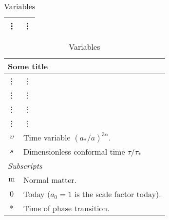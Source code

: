 \begin{table}
\begin{minipage}{0.5\linewidth}
{{\begin{tabular*}{\linewidth}{c l}
            \vdots & \vdots\\
            \bottomrule
        \end{tabular*}
        }}
    \end{minipage}\hfill
    \begin{minipage}{0.5\linewidth}
        {\small{
        \begin{tabular*}{\linewidth}{c l}
            \multicolumn{2}{l}{\textsf{Some title}} \\
            \toprule
            \vdots & \vdots \\
            \vdots & \vdots \\
            \vdots & \vdots \\
            \vdots & \vdots \\
            $\upsilon$ &  Time variable $(a_\ast/a)^{3\alpha}$. \\
            $s$ &  Dimensionless conformal time $\tau/\tau_\ast$  \\
            \midrule
            \multicolumn{2}{l}{\textit{Subscripts}} \\
            \midrule
            $\mathrm{m}$ & Normal matter. \\
            $0$ & Today ($a_0=1$ is the scale factor today). \\
            $*$ & Time of phase transition. \\
            \bottomrule
        \end{tabular*}
        }}
    \end{minipage}
    \caption{Variables \blahblah}
\end{table}







\clearpage
\newpage


